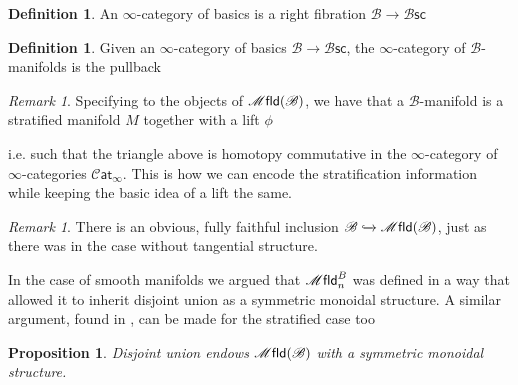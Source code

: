 \documentclass[12pt,a4paper]{article}
\newcounter{counter} \numberwithin{counter}{section}
\theoremstyle{definition}
\newtheorem{definition}[counter]{Definition}
\theoremstyle{plain}
\newtheorem{proposition}[counter]{Proposition}
\theoremstyle{remark}
\newtheorem{remark}[counter]{Remark}
\newcommand{\mfld}[1][s]{%
    \ifx r#1\mathsf{Mfld}\else
    \ifx s#1\mathscr{M} \mathsf{fld}\else
    \mathrm{Illegal~option}%
    \fi\fi
}
\newcommand{\cat}{\mathscr{C} \mathsf{at}_{\infty}}
\newcommand{\bsc}{\mathscr{B} \mathsf{sc}}
\newcommand{\bstr}{\mathscr{B}}
\newcommand{\snglr}{\mathscr{S} \mathsf{nglr}}
\begin{document}
\begin{definition}
    An $\infty$-category of basics is a right fibration $\bstr \rightarrow \bsc$
\end{definition}

\begin{definition}
    Given an $\infty$-category of basics $\bstr \rightarrow \bsc$, the $\infty$-category of $\bstr$-manifolds is the pullback
    \begin{center}
    \end{center}
\end{definition}

\begin{remark}
    Specifying to the objects of $\mfld(\bstr)$, we have that a $\bstr$-manifold is a stratified manifold $M$ together with a lift $\phi$
    \begin{center}
    \end{center}
    i.e. such that the triangle above is homotopy commutative in the $\infty$-category of $\infty$-categories $\cat$. This is how we can encode the stratification information while keeping the basic idea of a lift the same.
\end{remark}

\begin{remark}
    There is an obvious, fully faithful inclusion $\bstr \xhookrightarrow{} \mfld(\bstr)$, just as there was in the case without tangential structure.
\end{remark}

In the case of smooth manifolds we argued that $\mfld_n^B$ was defined in a way that allowed it to inherit disjoint union as a symmetric monoidal structure. A similar argument, found in \cite{aft_fhstrat}, can be made for the stratified case too 

\begin{proposition}
    Disjoint union endows $\mfld(\bstr)$ with a symmetric monoidal structure.
\end{proposition}
\end{document}
